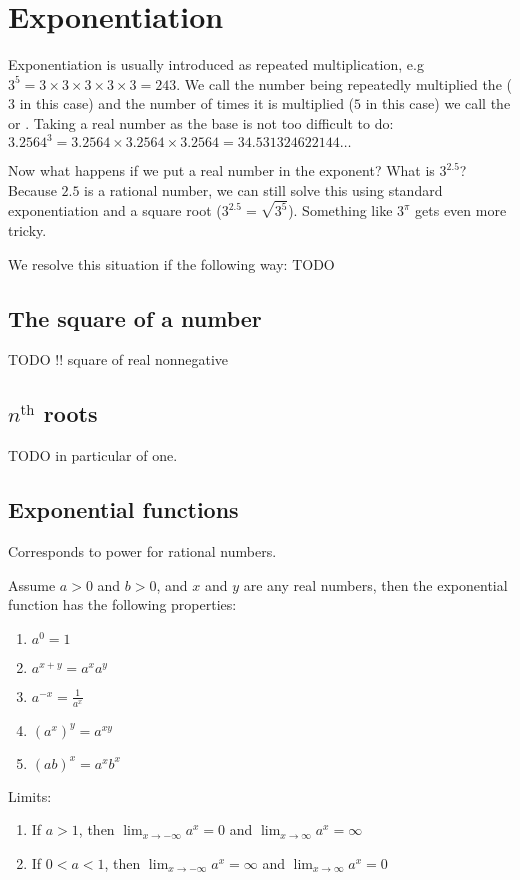 \section{Exponentiation}
Exponentiation is usually introduced as repeated multiplication, e.g\ $3^5 = 3\times 3\times 3 \times 3 \times 3 = 243$.  We call the number being repeatedly multiplied the  ($3$ in this case) and the number of times it is multiplied ($5$ in this case) we call the  or . Taking a real number as the base is not too difficult to do: $3.2564^3 = 3.2564\times 3.2564\times 3.2564 = 34.531324622144\ldots$

Now what happens if we put a real number in the exponent? What is $3^{2.5}$? Because $2.5$ is a rational number, we can still solve this using standard exponentiation and a square root ($3^{2.5} = \sqrt{3^5}$). Something like $3^\pi$ gets even more tricky.

We resolve this situation if the following way: TODO

\subsection{The square of a number}
TODO
!! square of real nonnegative

\subsection{$n^\text{th}$ roots}
TODO in particular of one.


\subsection{Exponential functions}
Corresponds to power for rational numbers.

Assume $a>0$ and $b>0$, and $x$ and $y$ are any real numbers, then the exponential function has the following properties:
\begin{enumerate}
\item $a^0 = 1$
\item $a^{x+y} = a^x a^y$
\item $a^{-x} = \frac{1}{a^x}$
\item $(a^x)^y = a^{xy}$
\item $(ab)^x = a^x b^x$
\end{enumerate}
Limits:
\begin{enumerate}
\item If $a>1$, then $\lim_{x\to -\infty} a^x = 0$ and $ \lim_{x\to \infty} a^x = \infty$
\item If $0 < a < 1$, then $\lim_{x\to -\infty} a^x = \infty$ and $ \lim_{x\to \infty} a^x = 0$
\end{enumerate}

